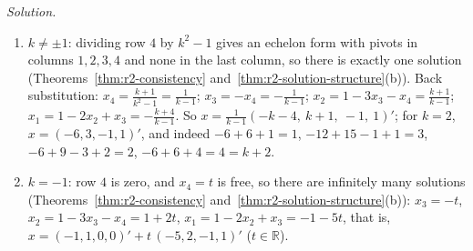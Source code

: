 \documentclass[12pt]{article}
\newcommand{\R}{\mathbb R}
\theoremstyle{definition}
\newenvironment{solution}{\par\noindent\textit{Solution.}\ }{\par\smallskip}
\begin{document}
\begin{solution}
\begin{enumerate}
(Theorem~\ref{thm:r2-consistency}).
\item \(k\ne\pm1\): dividing row \(4\) by \(k^2-1\) gives an echelon form with pivots in columns \(1,2,3,4\) and
none in the last column, so there is exactly one solution
(Theorems~\ref{thm:r2-consistency} and~\ref{thm:r2-solution-structure}(b)). Back
substitution: \(x_4=\frac{k+1}{k^2-1}=\frac1{k-1}\); \(x_3=-x_4=-\frac1{k-1}\);
\(x_2=1-3x_3-x_4=\frac{k+1}{k-1}\); \(x_1=1-2x_2+x_3=-\frac{k+4}{k-1}\).
So \(x=\frac1{k-1}(-k-4,\ k+1,\ -1,\ 1)'\); for \(k=2\), \(x=(-6,3,-1,1)'\), and indeed \(-6+6+1=1\),
\(-12+15-1+1=3\), \(-6+9-3+2=2\), \(-6+6+4=4=k+2\).
\item \(k=-1\): row \(4\) is zero, and \(x_4=t\) is free, so there are infinitely many solutions
(Theorems~\ref{thm:r2-consistency} and~\ref{thm:r2-solution-structure}(b)): \(x_3=-t\),
\(x_2=1-3x_3-x_4=1+2t\), \(x_1=1-2x_2+x_3=-1-5t\), that is, \(x=(-1,1,0,0)'+t\,(-5,2,-1,1)'\) (\(t\in\R\)).
\end{enumerate}
\end{solution}
\end{document}

